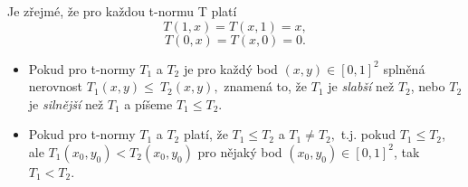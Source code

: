 \begin{graph}
\end{graph}

\begin{remark}
    Je zřejmé, že pro každou t-normu T platí
    $$T(1,x)=T(x,1)=x,$$
    $$T(0,x)=T(x,0)=0.$$
\end{remark}

\begin{definition}
    \begin{itemize}
    \cite{hlinena}
        \item Pokud pro t-normy $T_1$ a $T_2$ je
        pro každý bod $(x,y) \in [0,1]^2$ splněná nerovnost
        $T_1(x,y)\leq ~T_2(x,y),$ znamená to, že $T_1$ je {\em slabší} než $T_2$,
        nebo $T_2$ je {\em silnější} než $T_1$ a píšeme $T_1\leq T_2$.
        \item  Pokud pro t-normy $T_1$ a $T_2$ platí, že $T_1 \leq T_2$ a
        $T_1 \ne T_2,$ t.j. pokud $T_1 \leq T_2$, ale $T_1(x_0,y_0) <
        T_2(x_0,y_0)$ pro nějaký bod $(x_0,y_0) \in [0,1]^2$, tak $T_1<T_2$.
    \end{itemize}
\end{definition}


